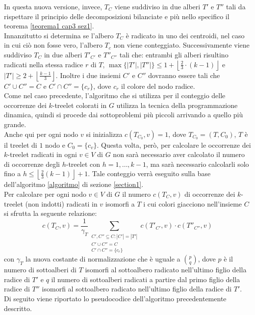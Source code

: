 In questa nuova versione, invece, $ T_C $ viene suddiviso in due alberi $ T' $ e $ T'' $ tali da  rispettare il principio delle decomposizioni bilanciate e pi\`u nello specifico il teorema \ref{teorema1 cap3 sez1}.\\
Innanzitutto si determina se l'albero $ T_C $ \`e radicato in uno dei centroidi, nel caso in cui ci\`o non fosse vero, l'albero $ T_c $ non viene conteggiato.
Successivamente viene suddiviso $ T_C $ in due alberi $ T'_{C'} $ e $ T''_{C''} $ tali che: entrambi gli alberi risultino radicati nella stessa radice $ r $ di $ T $,  $ \max\{|T'|,|T''|\} \le 1 + \left\lfloor \frac{2}{3} \cdot (k-1) \right\rfloor $ e $ |T'| \ge 2+\left\lfloor\frac{k-1}{3} \right\rfloor $.
Inoltre i due insiemi $ C' $ e $ C'' $ dovranno essere tali che $C' \cup C'' = C$ e $ C' \cap C'' = \{c_r\} $, dove $ c_r $ il colore del nodo radice.\\
Come nel caso precedente, l'algoritmo che si utilizza per il conteggio delle occorrenze dei $ k $-treelet colorati in $ G $ utilizza la tecnica della programmazione dinamica, quindi si procede dai sottoproblemi pi\`u piccoli arrivando a quello pi\`u grande.\\
Anche qui per ogni nodo $ v $ si inizializza $ c(T_{C_0} , v) = 1 $, dove $T_{C_0} = (T, C_0)$, $T$ \`e il treelet di $1$ nodo e $ C_0 = \{c_v\} $.
Questa volta, per\`o, per calcolare le occorrenze dei $ k $-treelet radicati in ogni $ v \in V $ di $ G $ non sar\`a necessario aver calcolato il numero di  occorrenze degli $h$-treelet con $h=1,\dots,k-1 $, ma sar\`a necessario calcolarli solo fino a $h \le  \left\lfloor \frac{2}{3}(k-1)\right\rfloor +1 $.
Tale conteggio verr\`a eseguito sulla base dell'algoritmo \ref{algoritmo} di sezione \ref{section1}. \\
Per calcolare per ogni nodo $v \in V  $ di $ G $ il numero $ c(T_C,v) $ di occorrenze dei $ k $-treelet (non indotti) radicati in $ v $ isomorfi a $ T $ i cui colori giacciono nell'insieme $ C $ si sfrutta la seguente relazione:
\[
c(T_C,v) = \frac{1}{\gamma_T}\sum_{\substack{
C',C'' \subseteq C : |C'| = |T'| \\
C' \cup C'' = C \\ 
C' \cap C'' = \{c_r\}}}
c(T'_{C'},v)\cdot c(T''_{C''},v)
 \] 
con $\gamma_T$ la nuova costante di normalizzazione che \`e uguale a $ \binom{p}{q} $, dove $ p  $ \`e il numero di sottoalberi di $ T $ isomorfi al sottoalbero radicato nell'ultimo figlio della radice di $ T' $ e $ q $ il numero di sottoalberi radicati a partire dal primo figlio della radice di $ T'' $ isomorfi al sottoalbero radicato nell'ultimo figlio della radice di $ T' $.
Di seguito viene riportato lo pseudocodice dell'algoritmo precedentemente descritto.

